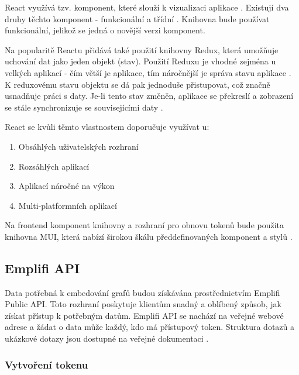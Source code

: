 \documentclass[czech, bc, kiv, he, iso690numb]{fasthesis}
\begin{document}
React využívá tzv. komponent, které slouží k vizualizaci aplikace \cite{introToReact}. Existují dva druhy těchto komponent - funkcionální a třídní \cite{functionalVsClass}. Knihovna bude používat funkcionální, jelikož
se jedná o novější verzi komponent.

Na popularitě Reactu přidává také použití knihovny Redux, která umožňuje uchování dat jako jeden objekt (stav). Použití Reduxu je vhodné zejména u velkých aplikací - čím větší je aplikace, tím
náročnější je správa stavu aplikace \cite{introToRedux}. K reduxovému stavu objektu se dá pak jednoduše přistupovat, což značně usnadňuje práci s daty.
Je-li tento stav změněn, aplikace se překreslí a zobrazení se stále synchronizuje se souvisejícími daty \cite{whyUsingReact2}. 

React se kvůli těmto vlastnostem doporučuje využívat u:
\begin{enumerate}
\item Obsáhlých uživatelských rozhraní
\item Rozsáhlých aplikací
\item Aplikací náročné na výkon
\item Multi-platformních aplikací
\end{enumerate}

Na frontend komponent knihovny a rozhraní pro obnovu tokenů bude použita knihovna MUI, která nabízí širokou škálu předdefinovaných komponent a stylů \cite{muiDocs}. 	

\subsection{Emplifi API}	
Data potřebná k embedování grafů budou získávána prostřednictvím Emplifi Public API. 
Toto rozhraní poskytuje klientům snadný a oblíbený způsob, jak získat přístup k potřebným datům. 
Emplifi API se nachází na veřejné webové adrese a žádat o data může každý, kdo má přístupový token.
Struktura dotazů a ukázkové dotazy jsou dostupné na veřejné dokumentaci \cite{emplifiDocs}.

\subsubsection{Vytvoření tokenu}
\end{document}
